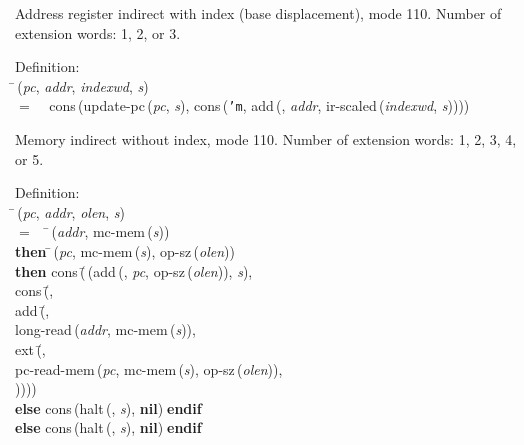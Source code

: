  Address register indirect with index (base displacement), mode 110.
 Number of extension words: 1, 2, or 3.
\begin{tabbing}{\sc Definition}: \\  
\=\,({\it{pc\/}}, {\it{addr\/}}, {\it{indexwd\/}}, {\it{s\/}}) \\ 
$=$$\;\;\;\;${\rm{cons}}\,({\rm{update-pc}}\,({\it{pc\/}}, {\it{s\/}}), {\rm{cons}}\,({\tt{'}}{\tt{m}}, {\rm{add}}\,({}, {\it{addr\/}}, {\rm{ir-scaled}}\,({\it{indexwd\/}}, {\it{s\/}}))))\-
\end{tabbing}

 Memory indirect without index, mode 110.
 Number of extension words: 1, 2, 3, 4, or 5.
\begin{tabbing}{\sc Definition}: \\  
\=\,({\it{pc\/}}, {\it{addr\/}}, {\it{olen\/}}, {\it{s\/}}) \\ 
$=$$\;\;\;\;$\=\,({\it{addr\/}}, {\rm{mc-mem}}\,({\it{s\/}})) \\ 
{\bf then }\=\,({\it{pc\/}}, {\rm{mc-mem}}\,({\it{s\/}}), {\rm{op-sz}}\,({\it{olen\/}})) \\ 
{\bf then }{\rm{cons}}\,(\=\,({\rm{add}}\,({}, {\it{pc\/}}, {\rm{op-sz}}\,({\it{olen\/}})), {\it{s\/}}), \\ 
{\rm{cons}}\,(\=, \\ 
{\rm{add}}\,(\=, \\ 
{\rm{long-read}}\,({\it{addr\/}}, {\rm{mc-mem}}\,({\it{s\/}})), \\ 
{\rm{ext}}\,(\=, \\ 
{\rm{pc-read-mem}}\,({\it{pc\/}}, {\rm{mc-mem}}\,({\it{s\/}}), {\rm{op-sz}}\,({\it{olen\/}})), \\ 
{})\-)\-)\-)\- \\ 
{\bf else }{\rm{cons}}\,({\rm{halt}}\,({}, {\it{s\/}}), {\bf{nil}})$\;${\bf  endif}\- \\ 
{\bf else }{\rm{cons}}\,({\rm{halt}}\,({}, {\it{s\/}}), {\bf{nil}})$\;${\bf  endif}\-\-
\end{tabbing}

